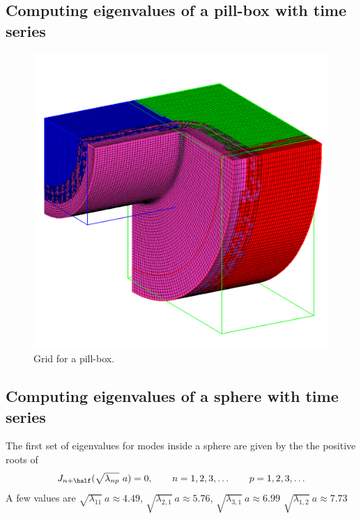 \clearpage
\subsection{Computing eigenvalues of a pill-box with time series}

\renewcommand{\figWidth}{.495\linewidth}
\begin{figure}
\begin{center}
\includegraphics[width=\figWidth]{figures/pillBox2-order4-grid}
\end{center}
\caption{Grid for a pill-box.}
\end{figure}


\clearpage
\subsection{Computing eigenvalues of a sphere with time series}

The first set of eigenvalues for modes inside a sphere are given by the the positive roots of 
\begin{align*}
  J_{n+\half}(\sqrt{\lambda_{np}}~ a)=0 , \qquad n=1,2,3,\ldots \qquad p=1,2,3,\ldots
\end{align*}
A few values are $\sqrt{\lambda_{11}}~ a \approx 4.49$, $\sqrt{\lambda_{2,1}}~ a \approx 5.76$,
$\sqrt{\lambda_{3,1}}~ a \approx 6.99$ 
$\sqrt{\lambda_{1,2}}~ a \approx 7.73$ 


